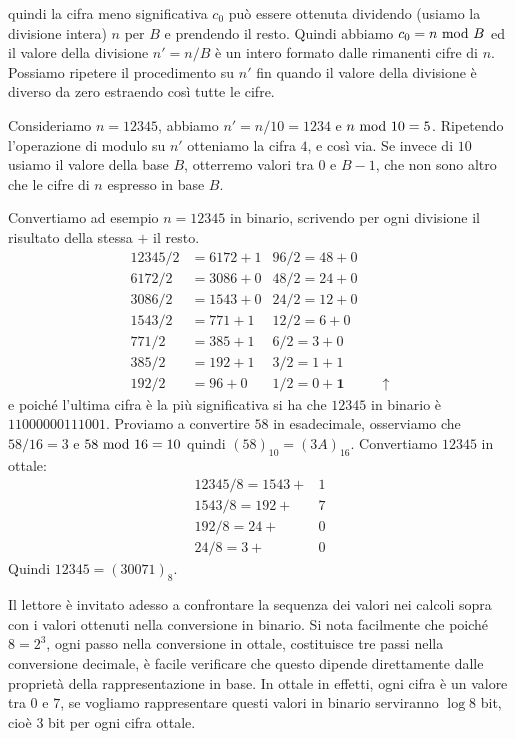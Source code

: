 \noindent quindi la cifra meno significativa $c_0$ può essere ottenuta
dividendo (usiamo la divisione intera) $n$ per $B$ e prendendo il resto.
 Quindi abbiamo $c_0 = n \ \text{mod}\ B$ ed il valore della divisione $n' = n /
B$ è un intero formato dalle rimanenti cifre di $n$. Possiamo ripetere il
procedimento su $n'$ fin quando il valore della divisione è diverso da zero estraendo così tutte le cifre.

\begin{ex}
Consideriamo $n = 12345$, abbiamo $n' = n/10 = 1234$ e $n \ \text{mod}\ 10 = 5$. Ripetendo l'operazione di modulo su $n'$ otteniamo la cifra $4$, e così via. Se
invece di $10$ usiamo il valore della base $B$, otterremo valori tra $0$ e $B-1$, che non sono altro che le cifre di $n$ espresso in base $B$.

Convertiamo ad esempio $n = 12345$ in binario, scrivendo per ogni divisione il risultato della stessa $+$ il resto.
\begin{align*}
 12345 / 2 &= 6172 + 1   &96 / 2 = 48 + 0\\
 6172  / 2 &= 3086 + 0   &48 / 2 = 24 + 0\\
 3086  / 2 &= 1543 + 0   &24 / 2 = 12 + 0\\
 1543  / 2 &= 771 + 1    &12 / 2 = 6 + 0\\
 771   / 2 &= 385 + 1    &6 / 2  = 3 + 0\\
 385   / 2 &= 192 + 1    &3 / 2  = 1 + 1\\
 192   / 2 &= 96 + 0     &1 / 2  = 0 + \mathbf{1}& \quad \uparrow
\end{align*}
e poiché l'ultima cifra è la più significativa si ha che $12345$ in binario è $11000000111001$. Proviamo a convertire $58$ in esadecimale, osserviamo che $58/16 = 3$ e $58 \ \text{mod}\ 16 = 10$ quindi $(58)_{10} = (3A)_{16}$. Convertiamo $12345$ in ottale:
\begin{align*}
 12345 / 8 = 1543 + &1 \\
 1543  / 8 = 192 + &7   \\
 192  / 8  = 24 + &0 \\
 24  / 8   = 3 + &0
\end{align*}
\noindent Quindi $12345 = (30071)_8$.
\end{ex}

Il lettore è invitato adesso a confrontare la sequenza dei valori nei calcoli sopra con i valori ottenuti nella conversione in binario. Si nota facilmente che poiché $8 = 2^3$, ogni passo nella conversione in ottale, costituisce tre passi nella conversione decimale, è facile verificare che questo dipende direttamente dalle proprietà della rappresentazione in base. In ottale in effetti, ogni cifra è un valore tra $0$ e $7$, se vogliamo rappresentare questi valori in binario serviranno $\log 8$ bit, cioè $3$ bit per ogni cifra ottale.

